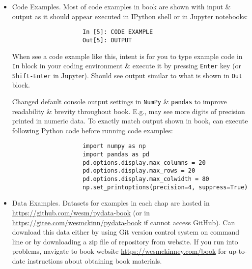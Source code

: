 \documentclass{article}
\begin{document}
\begin{enumerate}
\begin{itemize}
\begin{itemize}
			\begin{itemize}
				\item {\sf Code Examples.} Most of code examples in book are shown with input \& output as it should appear executed in IPython shell or in Jupyter notebooks:
				\begin{verbatim}
					In [5]: CODE EXAMPLE
					Out[5]: OUTPUT
				\end{verbatim}
				When see a code example like this, intent is for you to type example code in {\tt In} block in your coding environment \& execute it by pressing {\tt Enter} key (or {\tt Shift-Enter} in Jupyter). Should see output similar to what is shown in {\tt Out} block.
				
				Changed default console output settings in {\tt NumPy} \& {\tt pandas} to improve readability \& brevity throughout book. E.g., may see more digits of precision printed in numeric data. To exactly match output shown in book, can execute following Python code before running code examples:
				\begin{verbatim}
					import numpy as np
					import pandas as pd
					pd.options.display.max_columns = 20
					pd.options.display.max_rows = 20
					pd.options.display.max_colwidth = 80
					np.set_printoptions(precision=4, suppress=True)
				\end{verbatim}
				\item {\sf Data Examples.} Datasets for examples in each chap are hosted in \url{https://github.com/wesm/pydata-book} (or in \url{https://gitee.com/wesmckinn/pydata-book} if cannot access GitHub). Can download this data either by using Git version control system on command line or by downloading a zip file of repository from website. If you run into problems, navigate to book website \url{https://wesmckinney.com/book} for up-to-date instructions about obtaining book materials.
				

\end{itemize}
\end{itemize}
\end{itemize}
\end{enumerate}
\end{document}

